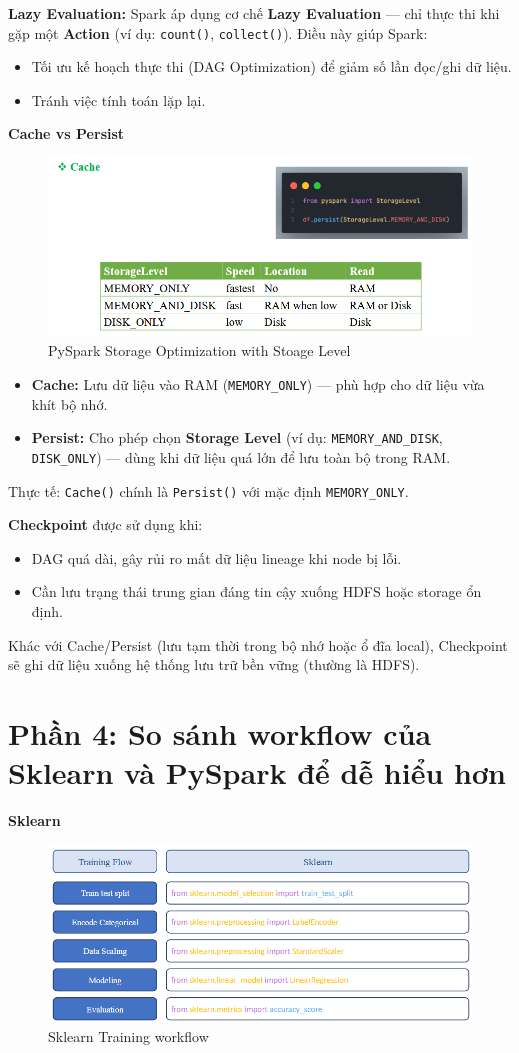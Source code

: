 \documentclass[11pt]{article}
\begin{document}
\textbf{Lazy Evaluation:}
Spark áp dụng cơ chế \textbf{Lazy Evaluation} — chỉ thực thi khi gặp một \textbf{Action} (ví dụ: \texttt{count()}, \texttt{collect()}). Điều này giúp Spark:
\begin{itemize}
    \item Tối ưu kế hoạch thực thi (DAG Optimization) để giảm số lần đọc/ghi dữ liệu.
    \item Tránh việc tính toán lặp lại.
\end{itemize}

\textbf{Cache vs Persist}
\begin{figure}[H]
    \centering
    \includegraphics[width=0.7\linewidth]{spark_StorageLevel.png}
    \caption{PySpark Storage Optimization with Stoage Level}
\end{figure}


\begin{itemize}
    \item \textbf{Cache:} Lưu dữ liệu vào RAM (\texttt{MEMORY\_ONLY}) — phù hợp cho dữ liệu vừa khít bộ nhớ.
    \item \textbf{Persist:} Cho phép chọn \textbf{Storage Level} (ví dụ: \texttt{MEMORY\_AND\_DISK}, \texttt{DISK\_ONLY}) — dùng khi dữ liệu quá lớn để lưu toàn bộ trong RAM.
\end{itemize}
\noindent
Thực tế: \texttt{Cache()} chính là \texttt{Persist()} với mặc định \texttt{MEMORY\_ONLY}.


\textbf{Checkpoint} được sử dụng khi:
\begin{itemize}
    \item DAG quá dài, gây rủi ro mất dữ liệu lineage khi node bị lỗi.
    \item Cần lưu trạng thái trung gian đáng tin cậy xuống HDFS hoặc storage ổn định.
\end{itemize}
Khác với Cache/Persist (lưu tạm thời trong bộ nhớ hoặc ổ đĩa local), Checkpoint sẽ ghi dữ liệu xuống hệ thống lưu trữ bền vững (thường là HDFS).

\section{Phần 4: So sánh workflow của Sklearn và PySpark để dễ hiểu hơn}
\textbf{Sklearn}
\begin{figure}[H]
    \centering
    \includegraphics[width=0.7\linewidth]{sklearnFlow.png}
    \caption{Sklearn Training workflow}
\end{figure}
\end{document}
